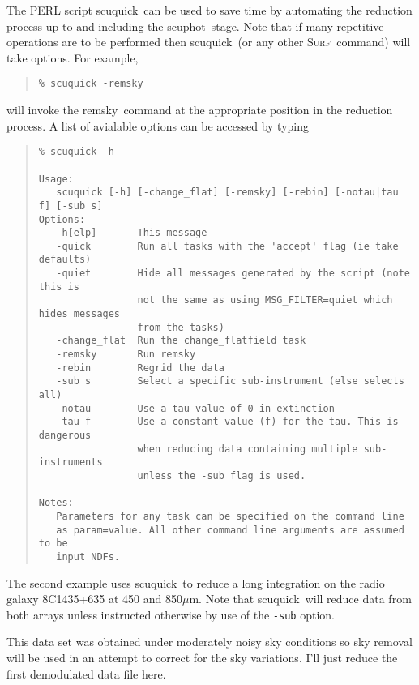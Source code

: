 \documentclass[twoside,11pt,fleqn]{article}
\newenvironment{myquote}{\begin{quote}\begin{small}}{\end{small}\end{quote}}
\newcommand{\surf}{\xref{\textsc{Surf}}{sun216}{}}
\newcommand{\task}[1]{{\sf #1}}
\newcommand{\scuphot}{\xref{\task{scuphot}}{sun216}{SCUPHOT}}
\newcommand{\scuquick}{\xref{\task{scuquick}}{sun216}{SCUQUICK}}
\newcommand{\remsky}{\xref{\task{remsky}}{sun216}{REMSKY}}
\newcommand{\xref}[3]{#1}
\begin{document}
The PERL script \scuquick\ can be used to save time by automating
the reduction process up to and including the \scuphot\ stage.
Note that if many repetitive operations are to be performed then
\scuquick\ (or any other \surf\ command) will take options.
For example,
\begin{myquote}
\begin{verbatim}
% scuquick -remsky
\end{verbatim}
\end{myquote}
will invoke the \remsky\ command at the appropriate position in
the reduction process. A list of avialable options can be accessed by typing
\begin{myquote}
\begin{verbatim}
% scuquick -h

Usage:
   scuquick [-h] [-change_flat] [-remsky] [-rebin] [-notau|tau f] [-sub s]
Options:
   -h[elp]       This message
   -quick        Run all tasks with the 'accept' flag (ie take defaults)
   -quiet        Hide all messages generated by the script (note this is
                 not the same as using MSG_FILTER=quiet which hides messages
                 from the tasks)
   -change_flat  Run the change_flatfield task
   -remsky       Run remsky
   -rebin        Regrid the data
   -sub s        Select a specific sub-instrument (else selects all)
   -notau        Use a tau value of 0 in extinction
   -tau f        Use a constant value (f) for the tau. This is dangerous
                 when reducing data containing multiple sub-instruments
                 unless the -sub flag is used.

Notes:
   Parameters for any task can be specified on the command line
   as param=value. All other command line arguments are assumed to be
   input NDFs.
\end{verbatim}
\end{myquote}

The second example uses \scuquick\ to reduce a long integration on
the radio galaxy 8C1435+635 at 450 and 850$\mu$m. Note that
\scuquick\ will reduce data from both arrays unless instructed
otherwise by use of the {\tt -sub} option.

This data set was obtained under moderately noisy sky conditions so
sky removal will be used in an attempt to correct for the sky
variations. I'll just reduce the first demodulated data file here.
\end{document}
